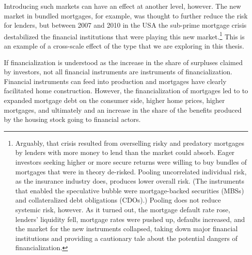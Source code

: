 Introducing such markets can have an effect at another level, however. The new market in bundled mortgages, for example, was thought to further reduce the risk for lenders, but between 2007 and 2010 in the USA the sub-prime mortgage crisis destabilized the financial institutions that were playing this new market.\footnote{Arguably, that crisis resulted from overselling risky and predatory mortgages by lenders with more money to lend than the market could absorb. Eager investors seeking higher or more secure returns were willing to buy bundles of mortgages that were in theory de-risked. Pooling uncorrelated individual risk, as the insurance industry does, produces lower overall risk. (The instruments that enabled the speculative bubble were mortgage-backed securities (MBSs) and collateralized debt obligations (CDOs).) Pooling does not reduce systemic risk, however. As it turned out, the mortgage default rate rose, lenders' liquidity fell, mortgage rates were pushed up, defaults increased, and the market for the new instruments collapsed, taking down major financial institutions and providing a cautionary tale about the potential dangers of financialization.} 
This is an example of a cross-scale effect of the type that we are exploring in this thesis.  



If financialization is understood as the increase in the share of surpluses claimed by investors, not all financial instruments are instruments of financialization. Financial instruments can feed into production and mortgages have clearly facilitated home construction. However, the financialization of mortgages led to to expanded mortgage debt on the consumer side, higher home prices, higher mortgages, and ultimately and an increase in the share of the benefits produced by the housing stock going to financial actors. 



